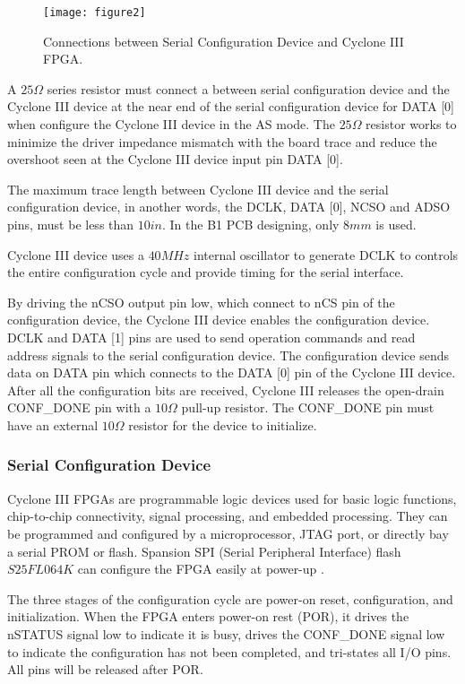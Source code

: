 \begin{figure}
 \centering
 \texttt{[image: figure2]}
 \caption{Connections between Serial Configuration Device and Cyclone III FPGA.}
 \label{fig:b2_f2}
\end{figure}

A $25\Omega$ series resistor must connect a between serial configuration device and the Cyclone III device at the near end of the serial configuration device for DATA [0] when configure the Cyclone III device in the AS mode. The $25\Omega$ resistor works to minimize the driver impedance mismatch with the board trace and reduce the overshoot seen at the Cyclone III device input pin DATA [0].

The maximum trace length between Cyclone III device and the serial configuration device, in another words, the DCLK, DATA [0], NCSO and ADSO pins, must be less than $10in$. In the B1 PCB designing, only $8mm$ is used.

Cyclone III device uses a $40MHz$ internal oscillator to generate DCLK to controls the entire configuration cycle and provide timing for the serial interface.

By driving the nCSO output pin low, which connect to nCS pin of the configuration device, the Cyclone III device enables the configuration device.  DCLK and DATA [1] pins are used to send operation commands and read address signals to the serial configuration device. The configuration device sends data on DATA pin which connects to the DATA [0] pin of the Cyclone III device. After all the configuration bits are received, Cyclone III releases the open-drain CONF\_DONE pin with a $10\Omega$ pull-up resistor. The CONF\_DONE pin must have an external $10\Omega$ resistor for the device to initialize.


\subsubsection{Serial Configuration Device}

Cyclone III FPGAs are programmable logic devices used for basic logic functions, chip-to-chip connectivity, signal processing, and embedded processing. They can be programmed and configured by a microprocessor, JTAG port, or directly bay a serial PROM or flash. Spansion SPI (Serial Peripheral Interface) flash $S25FL064K$ can configure the FPGA easily at power-up \citep{Spansion:2011:appnote}.

The three stages of the configuration cycle are power-on reset, configuration, and initialization. When the FPGA enters power-on rest (POR), it drives the nSTATUS signal low to indicate it is busy, drives the CONF\_DONE signal low to indicate the configuration has not been completed, and tri-states all I/O pins. All pins will be released after POR.

